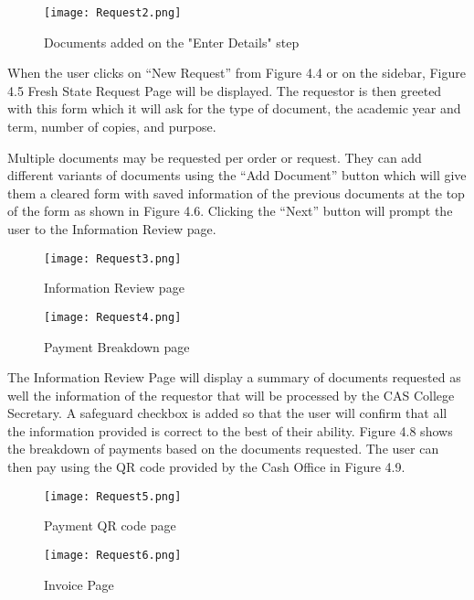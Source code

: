     \begin{figure}[h]
        \centering 
        \begin{minipage}[c]{0.5\linewidth}
            \centering
            \texttt{[image: Request2.png]}
            \caption{Documents added on the "Enter Details" step}
            \label{fig:Request2}
        \end{minipage}
    \end{figure}

When the user clicks on “New Request” from Figure 4.4 or on the sidebar, Figure 4.5 Fresh State Request Page will be displayed. The requestor is then greeted with this form which it will ask for the type of document, the academic year and term, number of copies, and purpose. 

Multiple documents may be requested per order or request. They can add different variants of documents using the “Add Document” button which will give them a cleared form with saved information of the previous documents at the top of the form as shown in Figure 4.6. Clicking the “Next” button will prompt the user to the Information Review page.

    \begin{figure}[h]
        \centering 
        \begin{minipage}[c]{0.5\linewidth}
            \centering
            \texttt{[image: Request3.png]}
            \caption{Information Review page}
            \label{fig:Request3}
        \end{minipage}\hfill
        \begin{minipage}[c]{0.5\linewidth}
            \centering
            \texttt{[image: Request4.png]}
            \caption{Payment Breakdown page}
            \label{fig:Request4}
        \end{minipage}
    \end{figure}

The Information Review Page will display a summary of documents requested as well the information of the requestor that will be processed by the CAS College Secretary. A safeguard checkbox is added so that the user will confirm that all the information provided is correct to the best of their ability. Figure 4.8 shows the breakdown of payments based on the documents requested. The user can then pay using the QR code provided by the Cash Office in Figure 4.9.

    \begin{figure}[h]
        \centering 
        \begin{minipage}[c]{0.5\linewidth}
            \centering
            \texttt{[image: Request5.png]}
            \caption{Payment QR code page}
            \label{fig:Request5}
        \end{minipage}\hfill
        \begin{minipage}[c]{0.5\linewidth}
            \centering
            \texttt{[image: Request6.png]}
            \caption{Invoice Page}
            \label{fig:Request6}
        \end{minipage}
    \end{figure}

